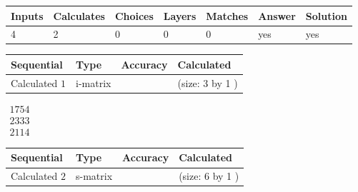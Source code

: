 \documentclass[12pt]{article}
\begin{document}
 
 
\noindent{}
 
 

 
 
 
\noindent{}
 
 

 
 
\noindent{}
 
 

 
\vspace{0.3in}
   
   
   
   
\noindent\begin{tabular}{|l|l|l|l|l|l|l|}
 \hline
Inputs & Calculates & Choices & Layers & Matches & Answer & Solution \\ \hline
 4  & 
 2  & 
 0
  & 
 0  & 
 0  & 
  yes & 
  yes 
  \\ \hline
 \end{tabular}
   
   
   
   
\noindent{}
   
   
  
  
\noindent\begin{tabular}{|l|l|l|l|}
\hline
 Sequential & Type & Accuracy & Calculated \\ 
\hline
 
 
  Calculated $  1 $ & i-matrix &  & 
 (size:  3  by  1 )
 \\  \hline  
 \end{tabular}
   
   
$\begin{array}{
 c
 }
 1754  \\ 
 2333  \\ 
 2114
 \end{array}  $ 
  
  
\noindent\begin{tabular}{|l|l|l|l|}
\hline
 Sequential & Type & Accuracy & Calculated \\ 
\hline
 
 
  Calculated $  2 $ & s-matrix & & 
 (size:  6  by  1 )
 \\  \hline  
 \end{tabular}
   
\end{document}
